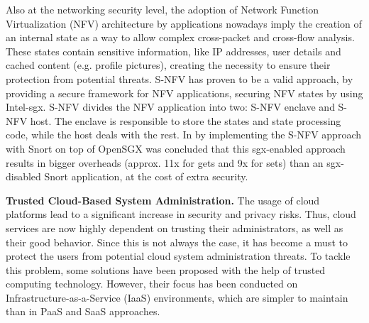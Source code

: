 Also at the networking security level, the adoption of Network Function Virtualization (NFV) architecture by applications nowadays imply the creation of an internal state as a way to allow complex cross-packet and cross-flow analysis. 
These states contain sensitive information, like IP addresses, user details and cached content (e.g. profile pictures), creating the necessity to ensure their protection from potential threats.
S-NFV \cite{sNFVPaper} has proven to be a valid approach, by providing a secure framework for NFV applications, securing NFV states by using Intel-\gls{sgx}.
S-NFV divides the NFV application into two: S-NFV enclave and S-NFV host. The enclave is responsible to store the states and state processing code, while the host deals with the rest.
In \cite{sNFVPaper} by implementing the S-NFV approach with Snort \cite{snortPaper} on top of OpenSGX was
concluded that this \gls{sgx}-enabled approach results in bigger overheads (approx. 11x for
gets and 9x for sets) than an \gls{sgx}-disabled Snort application, at the cost of extra security.\newline

\textbf{Trusted Cloud-Based System Administration.}
The usage of cloud platforms lead to a significant increase in security and privacy risks. Thus, cloud services are now highly dependent on trusting their administrators, as well as their good behavior. Since this is not always the case, it has become a must to protect the users from potential cloud system administration threats. 
To tackle this problem, some solutions have been proposed with the help of trusted computing technology. However, their focus has been conducted on Infrastructure-as-a-Service (IaaS) environments, which are simpler to maintain than in PaaS and SaaS approaches.

